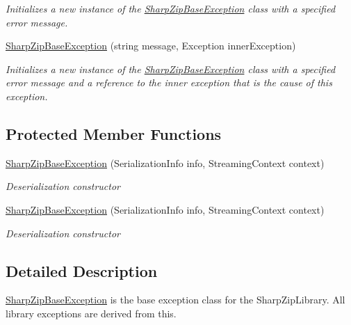 \begin{DoxyCompactItemize}
\begin{DoxyCompactList}\small\item\em Initializes a new instance of the \hyperlink{class_i_c_sharp_code_1_1_sharp_zip_lib_1_1_sharp_zip_base_exception}{Sharp\+Zip\+Base\+Exception} class with a specified error message. \end{DoxyCompactList}\item 
\hyperlink{class_i_c_sharp_code_1_1_sharp_zip_lib_1_1_sharp_zip_base_exception_ab56a3ebc05b9603c4eb14e47321c95f0}{Sharp\+Zip\+Base\+Exception} (string message, Exception inner\+Exception)
\begin{DoxyCompactList}\small\item\em Initializes a new instance of the \hyperlink{class_i_c_sharp_code_1_1_sharp_zip_lib_1_1_sharp_zip_base_exception}{Sharp\+Zip\+Base\+Exception} class with a specified error message and a reference to the inner exception that is the cause of this exception. \end{DoxyCompactList}\end{DoxyCompactItemize}
\subsection*{Protected Member Functions}
\begin{DoxyCompactItemize}
\item 
\hyperlink{class_i_c_sharp_code_1_1_sharp_zip_lib_1_1_sharp_zip_base_exception_ad0ddf1b8bb4dceb07a1eb492b2989ac1}{Sharp\+Zip\+Base\+Exception} (Serialization\+Info info, Streaming\+Context context)
\begin{DoxyCompactList}\small\item\em Deserialization constructor \end{DoxyCompactList}\item 
\hyperlink{class_i_c_sharp_code_1_1_sharp_zip_lib_1_1_sharp_zip_base_exception_ad0ddf1b8bb4dceb07a1eb492b2989ac1}{Sharp\+Zip\+Base\+Exception} (Serialization\+Info info, Streaming\+Context context)
\begin{DoxyCompactList}\small\item\em Deserialization constructor \end{DoxyCompactList}\end{DoxyCompactItemize}


\subsection{Detailed Description}
\hyperlink{class_i_c_sharp_code_1_1_sharp_zip_lib_1_1_sharp_zip_base_exception}{Sharp\+Zip\+Base\+Exception} is the base exception class for the Sharp\+Zip\+Library. All library exceptions are derived from this. 

